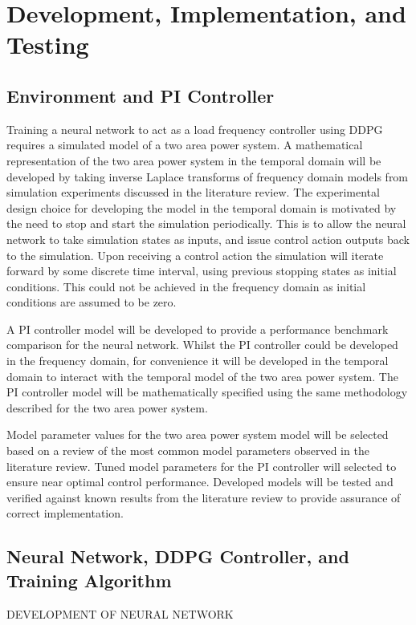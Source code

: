\section{Development, Implementation, and Testing}
\subsection{Environment and PI Controller}
Training a neural network to act as a load frequency controller using DDPG requires a simulated model of a two area power system. A mathematical representation of the two area power system in the temporal domain will be developed by taking inverse Laplace transforms of frequency domain models from simulation experiments discussed in the literature review. The experimental design choice for developing the model in the temporal domain is motivated by the need to stop and start the simulation periodically. This is to allow the neural network to take simulation states as inputs, and issue control action outputs back to the simulation. Upon receiving a control action the simulation will iterate forward by some discrete time interval, using previous stopping states as initial conditions. This could not be achieved in the frequency domain as initial conditions are assumed to be zero.

A PI controller model will be developed to provide a performance benchmark comparison for the neural network. Whilst the PI controller could be developed in the frequency domain, for convenience it will be developed in the temporal domain to interact with the temporal model of the two area power system. The PI controller model will be mathematically specified using the same methodology described for the two area power system.

Model parameter values for the two area power system model will be selected based on a review of the most common model parameters observed in the literature review. Tuned model parameters for the PI controller will selected to ensure near optimal control performance. Developed models will be tested and verified against known results from the literature review to provide assurance of correct implementation.

\subsection{Neural Network, DDPG Controller, and Training Algorithm}


DEVELOPMENT OF NEURAL NETWORK

